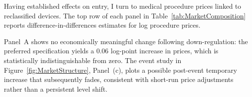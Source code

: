 \documentclass[letterpaper,12pt]{article}
\theoremstyle{definition}
\begin{document}

Having established effects on entry, I turn to medical procedure prices linked to reclassified devices. The top row of each panel in Table~\ref{tab:MarketComposition} reports difference-in-differences estimates for log procedure prices.\footnotemark {}

Panel~A shows no economically meaningful change following down-regulation: the preferred specification yields a 0.06 log-point increase in prices, which is statistically indistinguishable from zero. The event study in Figure~\ref{fig:MarketStructure}, Panel~(c), plots a possible post-event temporary increase that subsequently fades, consistent with short-run price adjustments rather than a persistent level shift.
\end{document}
